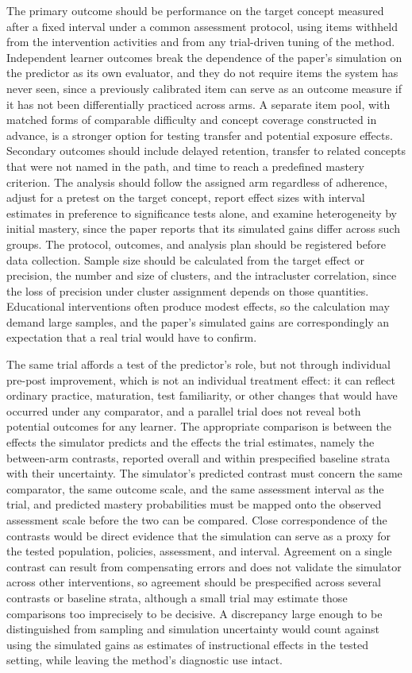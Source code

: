 \documentclass[11pt]{article}
\begin{document}
The primary outcome should be performance on the target concept measured after a fixed interval under a common assessment protocol, using items withheld from the intervention activities and from any trial-driven tuning of the method. Independent learner outcomes break the dependence of the paper's simulation on the predictor as its own evaluator, and they do not require items the system has never seen, since a previously calibrated item can serve as an outcome measure if it has not been differentially practiced across arms. A separate item pool, with matched forms of comparable difficulty and concept coverage constructed in advance, is a stronger option for testing transfer and potential exposure effects. Secondary outcomes should include delayed retention, transfer to related concepts that were not named in the path, and time to reach a predefined mastery criterion. The analysis should follow the assigned arm regardless of adherence, adjust for a pretest on the target concept, report effect sizes with interval estimates in preference to significance tests alone, and examine heterogeneity by initial mastery, since the paper reports that its simulated gains differ across such groups. The protocol, outcomes, and analysis plan should be registered before data collection. Sample size should be calculated from the target effect or precision, the number and size of clusters, and the intracluster correlation, since the loss of precision under cluster assignment depends on those quantities. Educational interventions often produce modest effects, so the calculation may demand large samples, and the paper's simulated gains are correspondingly an expectation that a real trial would have to confirm.

The same trial affords a test of the predictor's role, but not through individual pre-post improvement, which is not an individual treatment effect: it can reflect ordinary practice, maturation, test familiarity, or other changes that would have occurred under any comparator, and a parallel trial does not reveal both potential outcomes for any learner. The appropriate comparison is between the effects the simulator predicts and the effects the trial estimates, namely the between-arm contrasts, reported overall and within prespecified baseline strata with their uncertainty. The simulator's predicted contrast must concern the same comparator, the same outcome scale, and the same assessment interval as the trial, and predicted mastery probabilities must be mapped onto the observed assessment scale before the two can be compared. Close correspondence of the contrasts would be direct evidence that the simulation can serve as a proxy for the tested population, policies, assessment, and interval. Agreement on a single contrast can result from compensating errors and does not validate the simulator across other interventions, so agreement should be prespecified across several contrasts or baseline strata, although a small trial may estimate those comparisons too imprecisely to be decisive. A discrepancy large enough to be distinguished from sampling and simulation uncertainty would count against using the simulated gains as estimates of instructional effects in the tested setting, while leaving the method's diagnostic use intact.
\end{document}
